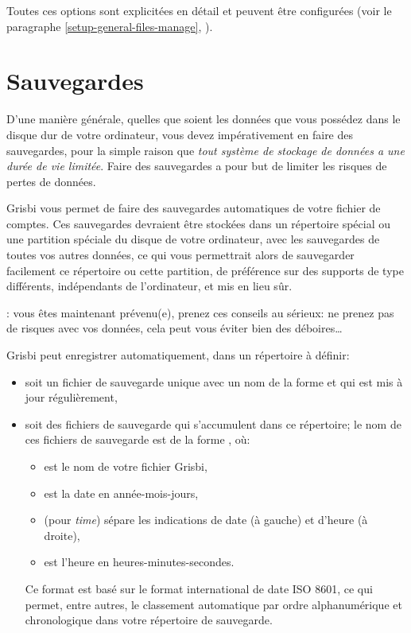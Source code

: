 Toutes ces options sont explicitées en détail et peuvent être configurées (voir le paragraphe \vref{setup-general-files-manage}, ).


\section{Sauvegardes\label{datamanagement-backups}}


D'une manière générale, quelles que soient les données que vous possédez dans le disque dur de votre ordinateur, vous devez impérativement en faire des sauvegardes, pour la simple raison que \emph{tout système de stockage de données a une durée de vie limitée}. Faire des sauvegardes a pour but de limiter les risques de pertes de données.

Grisbi vous permet de faire des sauvegardes automatiques de votre fichier de comptes. Ces sauvegardes devraient être stockées dans un répertoire spécial ou une \gls{partition} spéciale du disque de votre ordinateur, avec les sauvegardes de toutes vos autres données, ce qui vous permettrait alors de sauvegarder facilement ce répertoire ou cette partition, de préférence sur des supports de type différents, indépendants de l'ordinateur, et mis en lieu sûr.

\Note{}: vous êtes maintenant prévenu(e), prenez ces conseils au sérieux: ne prenez pas de risques avec vos données, cela peut vous éviter bien des déboires\ldots

Grisbi peut enregistrer automatiquement, dans un répertoire à définir:
\begin{itemize} 
 \item soit un fichier de sauvegarde unique avec un nom de la forme  et qui est mis à jour régulièrement,
 \item soit des fichiers de sauvegarde qui s'accumulent dans ce répertoire; le nom de ces fichiers de sauvegarde est de la forme , où:
 	\begin{itemize}
 		\item {} est le nom de votre fichier Grisbi,
 		\item {} est la date en année-mois-jours,
 		\item {} (pour \emph{time}) sépare les indications de date (à gauche) et d'heure (à droite),
 		\item {} est l'heure en heures-minutes-secondes.
 	\end{itemize}
 Ce format est basé sur le format international de date ISO 8601, ce qui permet, entre autres, le classement automatique par ordre alphanumérique et chronologique dans votre répertoire de sauvegarde.
\end{itemize}

